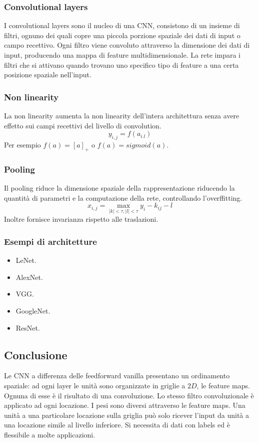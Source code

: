 		\subsubsection{Convolutional layers}
		I convolutional layers sono il nucleo di una CNN, consistono di un insieme di filtri, ognuno dei quali copre una piccola porzione spaziale dei dati di input o campo recettivo.
		Ogni filtro viene convoluto attraverso la dimensione dei dati di input, producendo una mappa di feature multidimensionale.
		La rete impara i filtri che si attivano quando trovano uno specifico tipo di feature a una certa posizione spaziale nell'input.

		\subsubsection{Non linearity}
		La non linearity aumenta la non linearity dell'intera architettura senza avere effetto sui campi recettivi del livello di convolution.
		$$y_{i,j} = f(a_{i.l})$$
		Per esempio $f(a) = [a]_+$ o $f(a) = sigmoid(a)$.

		\subsubsection{Pooling}
		Il pooling riduce la dimensione spaziale della rappresentazione riducendo la quantit\`a di parametri e la computazione della rete, controllando l'overffitting.
		$$x_{i,j} = \max\limits_{|k|<\tau, |l|<\tau}y_i - k_{ij} - l$$
		Inoltre fornisce invarianza rispetto alle traslazioni.

		\subsubsection{Esempi di architetture}
		\begin{multicols}{2}
			\begin{itemize}
				\item LeNet.
				\item AlexNet.
				\item VGG.
				\item GoogleNet.
				\item ResNet.
			\end{itemize}
		\end{multicols}

	\subsection{Conclusione}
	Le CNN a differenza delle feedforward vanilla presentano un ordinamento spaziale: ad ogni layer le unit\`a sono organizzate in griglie a $2D$, le feature maps.
	Ognuna di esse \`e il risultato di una convoluzione.
	Lo stesso filtro convoluzionale \`e applicato ad ogni locazione.
	I pesi sono diversi attraverso le feature maps.
	Una unit\`a a una particolare locazione sulla griglia pu\`o solo ricever l'input da unit\`a a una locazione simile al livello inferiore.
	Si necessita di dati con labels ed \`e flessibile a molte applicazioni.

